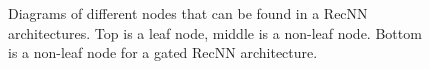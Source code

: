 \begin{figure}
    \begin{center}
    
    
    
    \caption{Diagrams of different nodes that can be found in a RecNN architectures. Top is a leaf node, middle is a non-leaf node. Bottom is a non-leaf node for a gated RecNN architecture.}
    \label{fig:recnn_nodes}
    \end{center}
\end{figure}

